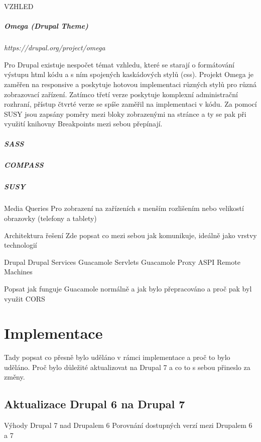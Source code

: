 \documentclass[10pt,draft,oneside]{fithesis2}
\begin{document}
VZHLED

\paragraph*{Omega (Drupal Theme)} \emph{https://drupal.org/project/omega}

Pro Drupal existuje nespočet témat vzhledu, které se starají o formátování výstupu html kódu a s ním spojených kaskádových stylů (css). Projekt Omega je zaměřen na \gls{responsive} a poskytuje hotovou implementaci různých stylů pro různá zobrazovací zařízení. Zatímco třetí verze poskytuje komplexní administrační rozhraní, přístup čtvrté verze se spíše zaměřil na implementaci v kódu. Za pomocí SUSY jsou zapsány poměry mezi bloky zobrazenými na stránce a ty se pak při využití knihovny Breakpoints\cite{website:breakpoints} mezi sebou přepínají.

\paragraph*{SASS}

\paragraph*{COMPASS}

\paragraph*{SUSY}


Media Queries
Pro zobrazení na zařízeních s menším rozlišením nebo velikostí obrazovky (telefony a tablety)

Architektura řešení
Zde popsat co mezi sebou jak komunikuje, ideálně jako vrstvy technologií

Drupal
Drupal Services
Guacamole Servlets
Guacamole Proxy
ASPI Remote Machines

Popsat jak funguje Guacamole normálně a jak bylo přepracováno a proč pak byl využit CORS


\chapter{Implementace}
\label{chap:implementace}

Tady popsat co přesně bylo uděláno v rámci implementace a proč to bylo uděláno. Proč bylo důležité aktualizovat na Drupal 7 a co to s sebou přineslo za změny.
\section{Aktualizace Drupal 6 na Drupal 7}
Výhody Drupal 7 nad Drupalem 6
Porovnání dostupných verzí mezi Drupalem 6 a 7
\end{document}
